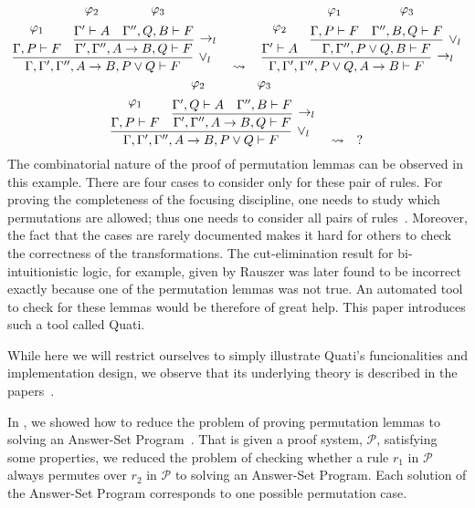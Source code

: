 \documentclass{llncs}
\newcommand\Pscr{\mathcal{P}}
\begin{document}
{\scriptsize
\[
\infer[\vee_l]{\Gamma, \Gamma', \Gamma'', A \rightarrow B , P \vee Q \vdash F}{
  \deduce{\Gamma, P \vdash F}{\varphi_1\vspace{0.2cm}}
  &
  \infer[\rightarrow_l]{\Gamma', \Gamma'', A \rightarrow B , Q \vdash F}{
    \deduce{\Gamma' \vdash A}{\varphi_2\vspace{0.2cm}}
    &
    \deduce{\Gamma'', Q, B \vdash F}{\varphi_3\vspace{0.2cm}}
  }
}
\quad\rightsquigarrow\quad
\infer[\rightarrow_l]{\Gamma, \Gamma', \Gamma'', P \vee Q, A \rightarrow B
\vdash F}{
  \deduce{\Gamma' \vdash A}{\varphi_2\vspace{0.2cm}}
  &
  \infer[\vee_l]{\Gamma, \Gamma'', P \vee Q, B \vdash F}{
    \deduce{\Gamma, P \vdash F}{\varphi_1\vspace{0.2cm}}
    &
    \deduce{\Gamma'', B, Q \vdash F}{\varphi_3\vspace{0.2cm}}
  }
}
\]
}
{\scriptsize
\[
\infer[\vee_l]{\Gamma, \Gamma', \Gamma'', A \rightarrow B , P \vee Q \vdash F}{
  \deduce{\Gamma, P \vdash F}{\varphi_1\vspace{0.2cm}}
  &
  \infer[\rightarrow_l]{\Gamma', \Gamma'', A \rightarrow B , Q \vdash F}{
    \deduce{\Gamma', Q \vdash A}{\varphi_2\vspace{0.2cm}}
    &
    \deduce{\Gamma'', B \vdash F}{\varphi_3\vspace{0.2cm}}
  }
}
\quad\rightsquigarrow\quad
?
\]
}%
The combinatorial nature of the proof of permutation lemmas can be observed in this example. There are four cases to consider
only for these pair of rules. For proving the completeness of the focusing discipline, 
one needs to study which permutations are allowed; thus one needs to consider all pairs of rules~\cite{miller07cslb}.
Moreover, the
fact that the cases are rarely documented makes it hard for others to check the
correctness of the transformations. The cut-elimination result for
bi-intuitionistic logic, for example, given by Rauszer \cite{rauszer74studia}
was later found to be incorrect \cite{crolard01tcs} exactly because one of the
permutation lemmas was not true. An automated tool to check for these lemmas
would be therefore of great help. This paper introduces such a tool called Quati.

While here we will restrict ourselves to simply illustrate Quati's funcionalities and implementation design, 
we observe that its underlying theory is described in the papers~\cite{nigam.jlc,nigam13iclp,nigam14ebl}. 
 
In \cite{nigam13iclp}, we showed how to reduce the problem of proving permutation lemmas to solving an Answer-Set
Program~\cite{gelfond}. That is given a proof system, $\Pscr$, satisfying some properties, we reduced the problem 
of checking whether a rule $r_1$ in $\Pscr$ always permutes over $r_2$ in $\Pscr$ to solving an Answer-Set Program.
Each solution of the Answer-Set Program corresponds to one possible permutation case. 
\end{document}
